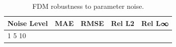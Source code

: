 \begin{table}[ht]
\centering
\caption{FDM robustness to parameter noise.}
\label{tab:noise_robustness}
\begin{tabular}{lcccc}
\toprule
Noise Level & MAE & RMSE & Rel L2 & Rel L∞ \\
\midrule
1%
5%
10%
\bottomrule
\end{tabular}
\end{table}